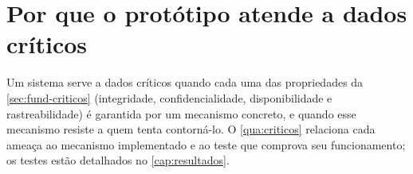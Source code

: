 \chapter[Por que o protótipo atende a dados críticos]{Por que o protótipo atende a dados \mbox{críticos}}\label{cap:criticos}

Um sistema serve a dados críticos quando cada uma das propriedades da \autoref{sec:fund-criticos} (integridade, confidencialidade, disponibilidade e rastreabilidade) é garantida por um mecanismo concreto, e quando esse mecanismo resiste a quem tenta contorná-lo. O \autoref{qua:criticos} relaciona cada ameaça ao mecanismo implementado e ao teste que comprova seu funcionamento; os testes estão detalhados no \autoref{cap:resultados}.

